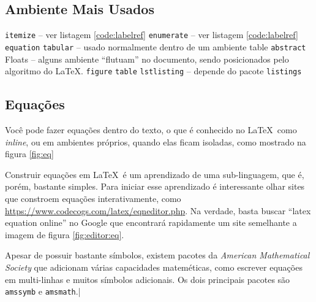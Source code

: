 \subsection{Ambiente Mais Usados}
\begin{outline}
    \1 \lstinline|itemize| -- ver listagem \ref{code:labelref}
    \1 \lstinline|enumerate| -- ver listagem \ref{code:labelref}
    \1 \lstinline|equation|
    \1 \lstinline|tabular|  -- usado normalmente dentro de um ambiente table
    \1 \lstinline|abstract|
    \1 Floats -- alguns ambiente ``flutuam'' no documento,
    sendo posicionados pelo algoritmo do \LaTeX. 
    \2 \lstinline|figure|
    \2 \lstinline|table|
    \2 \lstinline|lstlisting| -- depende do pacote \lstinline|listings|
\end{outline}

\subsection{Equações}

Você pode fazer equações dentro do texto, o que é conhecido no \LaTeX\ como \textit{inline}, ou em ambientes próprios, quando elas ficam isoladas, como mostrado na figura \ref{fig:eq}

Construir equações em \LaTeX\ é um aprendizado de uma sub-linguagem, que é, porém, bastante simples. Para iniciar esse aprendizado é interessante olhar sites que constroem equações interativamente, como \url{https://www.codecogs.com/latex/eqneditor.php}. Na verdade, basta buscar ``latex equation online'' no Google que encontrará rapidamente um site semelhante a imagem de figura \ref{fig:editor:eq}.

Apesar de possuir bastante símbolos, existem pacotes da \textit{American Mathematical Society} que adicionam várias capacidades mateméticas, como escrever equações em multi-linhas e muitos símbolos adicionais. Os dois principais pacotes são \lstinline|amssymb| e \lstinline|amsmath|.|

